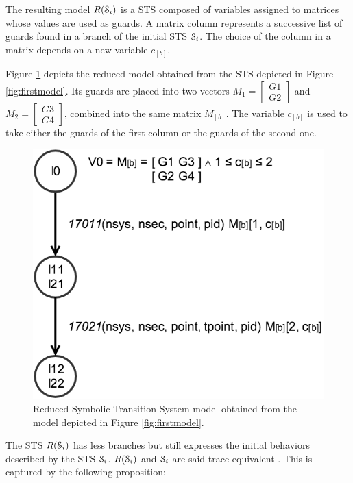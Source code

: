 The resulting model $R(\EuScript{S}_i)$ is a STS composed of
variables assigned to matrices whose values are used as guards. A
matrix column represents a successive list of guards found in a
branch of the initial STS $\EuScript{S}_i$. The choice of the
column in a matrix depends on a new variable $c_{[b]}$.

\begin{example}
Figure \ref{fig:reduced-model} depicts the reduced model obtained
from the STS depicted in Figure \ref{fig:firstmodel}. Its guards
are placed into two vectors
$M_1=\begin{bmatrix}G1\\G2\end{bmatrix}$ and
$M_2=\begin{bmatrix}G3\\G4\end{bmatrix}$, combined into the same
matrix $M_{[b]}$. The variable $c_{[b]}$ is used to take
either the guards of the first column or the guards of the
second one.

\begin{figure}[h]
    \begin{center}
        \includegraphics[width=0.6\linewidth]{figures/STS2.png}
    \end{center}

	\caption{Reduced Symbolic Transition System model obtained
    from the model depicted in Figure \ref{fig:firstmodel}.}
	\label{fig:reduced-model}
\end{figure}
\end{example}

The STS $R(\EuScript{S}_i)$ has less branches but still expresses
the initial behaviors described by the STS $\EuScript{S}_i$.
$R(\EuScript{S}_i)$ and $\EuScript{S}_i$ are said trace
equivalent \cite{petrenko06}.  This is captured by the following
proposition:

